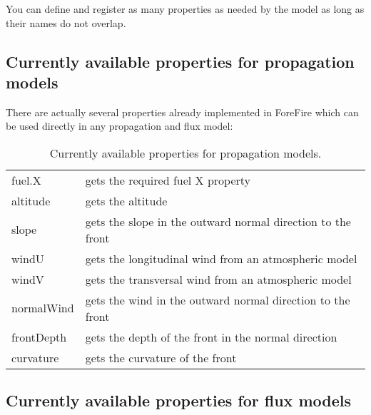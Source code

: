 \begin{center}
\end{center}

You can define and register as many properties as needed by the model as long as their names do not overlap.

\subsection*{Currently available properties for propagation models}

There are actually several properties already implemented in ForeFire which can be used directly in any propagation and flux model:
\begin{table}[htbp]
   	\begin{center}
   	\begin{tabular}{|l|l|}
		\hline
		fuel.X & gets the required fuel X property \\
		altitude & gets the altitude \\
		slope & gets the slope in the outward normal direction to the front \\
		windU & gets the longitudinal wind from an atmospheric model \\
		windV & gets the transversal wind from an atmospheric model \\
		normalWind & gets the wind in the outward normal direction to the front \\
		frontDepth & gets the depth of the front in the normal direction \\
		curvature & gets the curvature of the front \\
		\hline
	\end{tabular}
    \caption{Currently available properties for propagation models. \label{propprops}}
   	\end{center}
\end{table}

\subsection*{Currently available properties for flux models}

